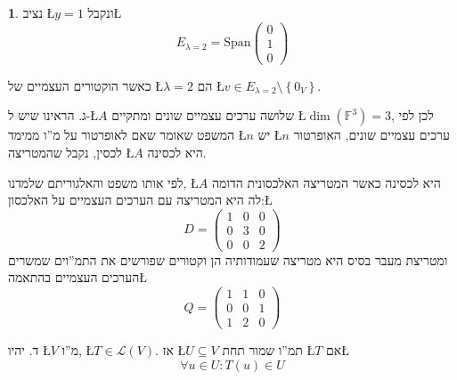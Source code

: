 \documentclass[english,hebrew]{article}
\theoremstyle{definition}
\theoremstyle{definition}
\newtheorem*{sol*}{\protect\solutionname}
\providecommand{\solutionname}{פתרון}
\begin{document}
\begin{sol*}
נציב \L{$y=1$} ונקבל\L{%
\[
E_{\lambda=2}=\text{Span}\begin{pmatrix}0\\
1\\
0
\end{pmatrix}
\]
}%

כאשר הוקטורים העצמיים של \L{$\lambda=2$} הם \L{$v\in E_{\lambda=2}\setminus\left\{ 0_{V}\right\} $}.

ג. הראינו שיש ל-\L{$A$} שלושה ערכים עצמיים שונים ומתקיים \L{$\dim\left(\mathbb{F}^{3}\right)=3$},
לכן לפי המשפט שאומר שאם לאופרטור על מ\textquotedblright ו ממימד \L{$n$}
יש \L{$n$} ערכים עצמיים שונים, האופרטור לכסין, נקבל שהמטריצה \L{$A$}
היא לכסינה. 

לפי אותו משפט והאלגוריתם שלמדנו, \L{$A$} היא לכסינה כאשר המטריצה
האלכסונית הדומה לה היא המטריצה עם הערכים העצמיים על האלכסון:\L{%
\[
D=\begin{pmatrix}1 & 0 & 0\\
0 & 3 & 0\\
0 & 0 & 2
\end{pmatrix}
\]
}%
 ומטריצת מעבר בסיס היא מטריצה שעמודותיה הן וקטורים שפורשים את התמ\textquotedblright וים
שמשרים הערכים העצמיים בהתאמה\L{%
\[
Q=\begin{pmatrix}1 & 1 & 0\\
0 & 0 & 1\\
1 & 2 & 0
\end{pmatrix}
\]
}%

ד. יהיו \L{$V$} מ\textquotedblright ו, \L{$T\in\mathcal{L}\left(V\right)$}.
אז \L{$U\subseteq V$} תמ\textquotedblright ו שמור תחת \L{$T$} אם\L{%
\[
\forall u\in U:T\left(u\right)\in U
\]
}%
\end{sol*}
\end{document}
